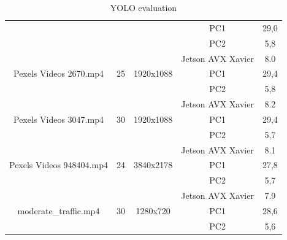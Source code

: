\documentclass[twoside]{ctuthesis}
\theoremstyle{plain}
\theoremstyle{definition}
\theoremstyle{note}
\begin{document}
\begin{table}[]
{\begin{tabular}{|c|c|c|c|c|}
			&                     &                            & PC1               & 29,0         \\ \cline{4-5} 
			&                     &                            & PC2               & 5,8          \\ \hline
			\multirow{3}{*}{Pexels Videos 2670.mp4}                                                                                                           & \multirow{3}{*}{25} & \multirow{3}{*}{1920x1088} & Jetson AVX Xavier & 8.0         \\ \cline{4-5} 
			&                     &                            & PC1               & 29,4         \\ \cline{4-5} 
			&                     &                            & PC2               & 5,8          \\ \hline
			\multirow{3}{*}{Pexels Videos 3047.mp4}                                                                                                           & \multirow{3}{*}{30} & \multirow{3}{*}{1920x1088} & Jetson AVX Xavier & 8.2         \\ \cline{4-5} 
			&                     &                            & PC1               & 29,4         \\ \cline{4-5} 
			&                     &                            & PC2               & 5,7          \\ \hline
			\multirow{3}{*}{Pexels Videos 948404.mp4}                                                                                                         & \multirow{3}{*}{24} & \multirow{3}{*}{3840x2178} & Jetson AVX Xavier & 8.1         \\ \cline{4-5} 
			&                     &                            & PC1               & 27,8         \\ \cline{4-5} 
			&                     &                            & PC2               & 5,7          \\ \hline
			\multirow{3}{*}{moderate\_traffic.mp4}                                                                                                            & \multirow{3}{*}{30} & \multirow{3}{*}{1280x720}  & Jetson AVX Xavier & 7.9         \\ \cline{4-5} 
			&                     &                            & PC1               & 28,6         \\ \cline{4-5} 
			&                     &                            & PC2               & 5,6          \\ \hline
		\end{tabular}%
	}
	\caption{YOLO evaluation}
	\label{yolo-evaluation}
\end{table}
\end{document}
